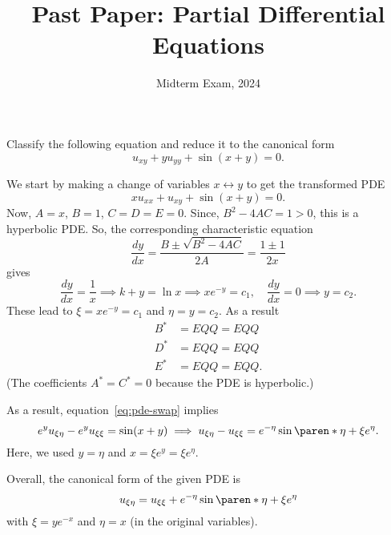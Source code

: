 \documentclass[11pt]{penrose}
\title{Past Paper: Partial Differential Equations}
\subtitle{Midterm Exam, 2024}
\begin{document}
\maketitle
\warningtext

\begin{problem}{1}
    Classify the following equation and reduce it to the canonical form
    \begin{equation*}
        u_{xy} + y u_{yy} + \sin(x+y) = 0.
    \end{equation*}

    \solution We start by making a change of variables $x \leftrightarrow y$ to get the transformed PDE
    \begin{equation*}
        x u_{xx} + u_{xy} + \sin(x+y) = 0. \tag{\textasteriskcentered}\label{eq:pde-swap}
    \end{equation*}
    Now, $A = x$, $B = 1$, $C = D = E = 0$. Since, $B^2 - 4AC = 1 > 0$, this is a hyperbolic PDE. So, the corresponding characteristic equation
    \begin{equation*}
        \frac{dy}{dx} = \frac{B \pm \sqrt{B^2 - 4AC}}{2A} = \frac{1 \pm 1}{2x}
    \end{equation*}
    gives
    \begin{equation*}
        \frac{dy}{dx} = \frac{1}{x} \implies k + y = \ln x \implies x e^{-y} = c_1, \quad
        \frac{dy}{dx} = 0 \implies y = c_2.
    \end{equation*}
    These lead to $\xi = x e^{-y} = c_1$ and $\eta = y = c_2$. As a result
    \begin{align*}
        B^{*} &= EQQ = EQQ\\
        D^{*} &= EQQ = EQQ\\
        E^{*} &= EQQ = EQQ.
    \end{align*}
    (The coefficients $A^{*} = C^{*} = 0$ because the PDE is hyperbolic.)

    As a result, equation~\eqref{eq:pde-swap} implies
    \begin{equation*}
        e^{y} u_{\xi\eta} - e^{y} u_{\xi\xi} = \sin(x + y)
        \implies u_{\xi\eta} - u_{\xi\xi} = e^{-\eta}\sin\paren*{\eta + \xi e^\eta}.
    \end{equation*}
    Here, we used $y = \eta$ and $x = \xi e^y = \xi e^\eta$.

    Overall, the canonical form of the given PDE is
    \begin{equation*}
        u_{\xi\eta} = u_{\xi\xi} + e^{-\eta}\sin\paren*{\eta + \xi e^\eta}
    \end{equation*}
    with $\xi = y e^{-x}$ and $\eta = x$ (in the original variables).
\end{problem}
\end{document}
